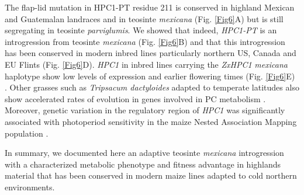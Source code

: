 \documentclass[9pt,twocolumn,twoside,lineno]{BioRxiv}
\begin{document}
The flap-lid mutation in HPC1-PT residue 211 is conserved in highland Mexican and Guatemalan landraces and in teosinte \textit{mexicana} (Fig. \ref{Fig6}A) but is still segregating in teosinte \textit{parviglumis}. 
We showed that indeed, \textit{HPC1-PT} is an introgression from teosinte \textit{mexicana} (Fig. \ref{Fig6}B) and that this introgression has been conserved in modern inbred lines particularly northern US, Canada and EU Flints (Fig. \ref{Fig6}D). 
\textit{HPC1} in inbred lines carrying the \textit{ZxHPC1} \textit{mexicana} haplotype show low levels of expression and earlier flowering times (Fig. \ref{Fig6}E) \cite{Kremling2018-gn}. 
Other grasses such as \textit{Tripsacum dactyloides} adapted to temperate latitudes also show accelerated rates of evolution in genes involved in PC metabolism \cite{Yan2019-tx}.
Moreover, genetic variation in the regulatory region of \textit{HPC1} was significantly associated with photoperiod sensitivity in the maize Nested Association Mapping population \cite{Hung2012-ms}. 

In summary, we documented here an adaptive teosinte \textit{mexicana} introgression with a characterized metabolic phenotype and fitness advantage in highlands material that has been conserved in modern maize lines adapted to cold northern environments. 

\end{document}
